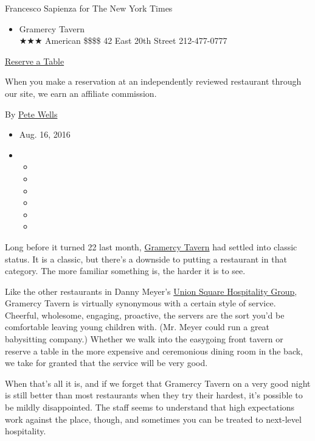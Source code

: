 Francesco Sapienza for The New York Times

\begin{itemize}
\tightlist
\item
  Gramercy Tavern\\
  ★★★ American \$\$\$\$ 42 East 20th Street 212-477-0777
\end{itemize}

\href{http://www.opentable.com/single.aspx?ref=4201\&rid=942}{Reserve a
Table}

When you make a reservation at an independently reviewed restaurant
through our site, we earn an affiliate commission.

By \href{http://www.nytimes3xbfgragh.onion/by/pete-wells}{Pete Wells}

\begin{itemize}
\item
  Aug. 16, 2016
\item
  \begin{itemize}
  \item
  \item
  \item
  \item
  \item
  \item
  \end{itemize}
\end{itemize}

Long before it turned 22 last month,
\href{http://www.gramercytavern.com/}{Gramercy Tavern} had settled into
classic status. It is a classic, but there's a downside to putting a
restaurant in that category. The more familiar something is, the harder
it is to see.

Like the other restaurants in Danny Meyer's
\href{http://www.ushgnyc.com/}{Union Square Hospitality Group}, Gramercy
Tavern is virtually synonymous with a certain style of service.
Cheerful, wholesome, engaging, proactive, the servers are the sort you'd
be comfortable leaving young children with. (Mr. Meyer could run a great
babysitting company.) Whether we walk into the easygoing front tavern or
reserve a table in the more expensive and ceremonious dining room in the
back, we take for granted that the service will be very good.

When that's all it is, and if we forget that Gramercy Tavern on a very
good night is still better than most restaurants when they try their
hardest, it's possible to be mildly disappointed. The staff seems to
understand that high expectations work against the place, though, and
sometimes you can be treated to next-level hospitality.

